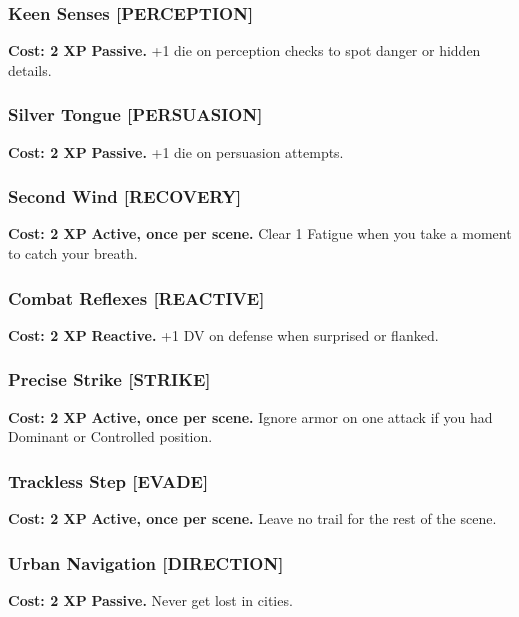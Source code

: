 \documentclass[12pt,a4paper]{book}
\begin{document}
\subsubsection*{Keen Senses \textnormal{[PERCEPTION]}}
\label{talent:keen-senses}
\textbf{Cost: 2 XP} \textbf{Passive.} +1 die on perception checks to spot danger or hidden details.

\subsubsection*{Silver Tongue \textnormal{[PERSUASION]}}
\label{talent:silver-tongue}
\textbf{Cost: 2 XP} \textbf{Passive.} +1 die on persuasion attempts.

\subsubsection*{Second Wind \textnormal{[RECOVERY]}}
\label{talent:second-wind}
\textbf{Cost: 2 XP} \textbf{Active, once per scene.} Clear 1 Fatigue when you take a moment to catch your breath.

\subsubsection*{Combat Reflexes \textnormal{[REACTIVE]}}
\label{talent:combat-reflexes}
\textbf{Cost: 2 XP} \textbf{Reactive.} +1 DV on defense when surprised or flanked.

\subsubsection*{Precise Strike \textnormal{[STRIKE]}}
\label{talent:precise-strike}
\textbf{Cost: 2 XP} \textbf{Active, once per scene.} Ignore armor on one attack if you had Dominant or Controlled position.

\subsubsection*{Trackless Step \textnormal{[EVADE]}}
\label{talent:trackless-step}
\textbf{Cost: 2 XP} \textbf{Active, once per scene.} Leave no trail for the rest of the scene.

\subsubsection*{Urban Navigation \textnormal{[DIRECTION]}}
\label{talent:urban-navigation}
\textbf{Cost: 2 XP} \textbf{Passive.} Never get lost in cities.
\end{document}

